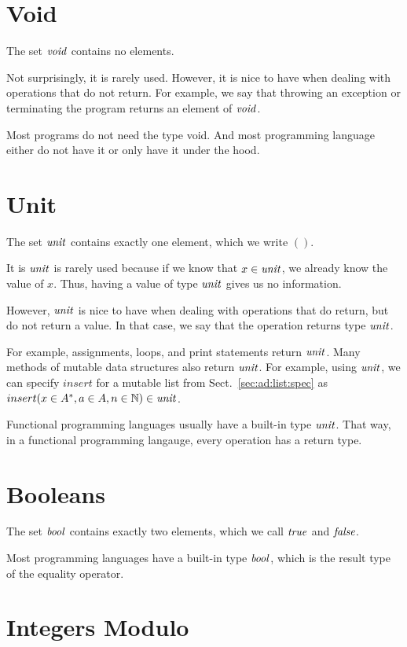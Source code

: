 \section{Void}

The set $\mathit{void}$ contains no elements.

Not surprisingly, it is rarely used.
However, it is nice to have when dealing with operations that do not return.
For example, we say that throwing an exception or terminating the program returns an element of $\mathit{void}$.

Most programs do not need the type void.
And most programming language either do not have it or only have it under the hood.

\section{Unit}

The set $\mathit{unit}$ contains exactly one element, which we write $()$.

It is $\mathit{unit}$ is rarely used because if we know that $x\in\mathit{unit}$, we already know the value of $x$.
Thus, having a value of type $\mathit{unit}$ gives us no information.

However, $\mathit{unit}$ is nice to have when dealing with operations that do return, but do not return a value.
In that case, we say that the operation returns type $\mathit{unit}$.

For example, assignments, loops, and print statements return $\mathit{unit}$.
Many methods of mutable data structures also return $\mathit{unit}$.
For example, using $\mathit{unit}$, we can specify $insert$ for a mutable list from Sect.~\ref{sec:ad:list:spec} as $insert(x\in A^*,a\in A,n\in\mathbb{N})\in\mathit{unit}$.

Functional programming languages usually have a built-in type $\mathit{unit}$.
That way, in a functional programming langauge, every operation has a return type.

\section{Booleans}

The set $\mathit{bool}$ contains exactly two elements, which we call $\mathit{true}$ and $\mathit{false}$.

Most programming languages have a built-in type $\mathit{bool}$, which is the result type of the equality operator.

\section{Integers Modulo}

